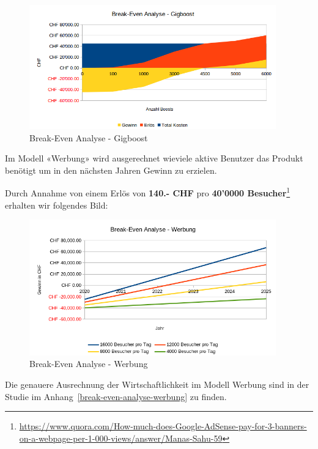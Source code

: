 \begin{figure}[!htb]
  \centering
  \includegraphics[width=0.95\textwidth]{initialisierung/wirtschaftlichkeit-gigboost.png}
  \caption{Break-Even Analyse - Gigboost}
\end{figure}

Im Modell «Werbung» wird ausgerechnet wieviele aktive Benutzer das Produkt benötigt
um in den nächsten Jahren Gewinn zu erzielen.

Durch Annahme von einem Erlös von \textbf{140.- CHF} pro \textbf{40'0000 Besucher}\footnote{\url{https://www.quora.com/How-much-does-Google-AdSense-pay-for-3-banners-on-a-webpage-per-1-000-views/answer/Manas-Sahu-59}} erhalten wir folgendes Bild:

\begin{figure}[!htb]
  \centering
  \includegraphics[width=0.95\textwidth]{initialisierung/wirtschaftlichkeit-werbung-updated.png}
  \caption{Break-Even Analyse - Werbung}
\end{figure}

Die genauere Ausrechnung der Wirtschaftlichkeit im Modell Werbung sind in der
Studie im Anhang~\ref{break-even-analyse-werbung} zu finden.
